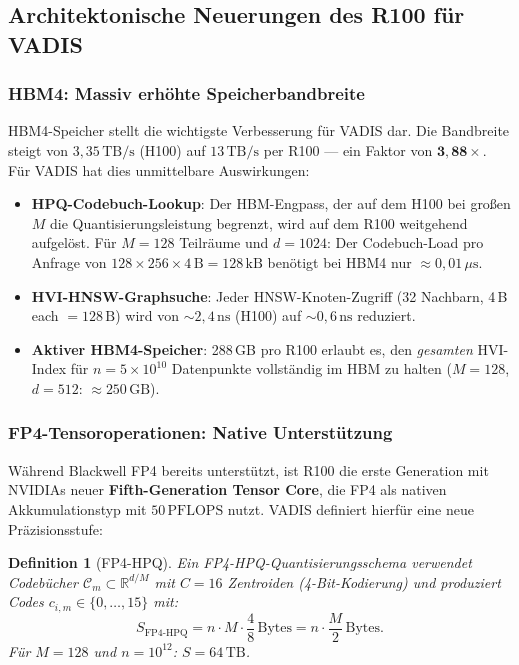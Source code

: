 ﻿\documentclass[12pt,a4paper]{article}
\newtheorem{definition}[theorem]{Definition}
\begin{document}
\subsection{Architektonische Neuerungen des R100 für VADIS}
\label{sub:r100_features}

\subsubsection{HBM4: Massiv erhöhte Speicherbandbreite}

HBM4-Speicher stellt die wichtigste Verbesserung für VADIS dar.
Die Bandbreite steigt von $3{,}35\,\text{TB/s}$ (H100) auf
$13\,\text{TB/s}$ per R100 --- ein Faktor von $\mathbf{3{,}88\times}$.
Für VADIS hat dies unmittelbare Auswirkungen:

\begin{itemize}[leftmargin=1.4em, itemsep=2pt]
  \item \textbf{HPQ-Codebuch-Lookup}: Der HBM-Engpass, der auf dem
        H100 bei großen $M$ die Quantisierungsleistung begrenzt,
        wird auf dem R100 weitgehend aufgelöst. Für $M = 128$
        Teilräume und $d = 1024$: Der Codebuch-Load pro
        Anfrage von $128 \times 256 \times 4\,\text{B} = 128\,\text{kB}$
        benötigt bei HBM4 nur $\approx 0{,}01\,\mu\text{s}$.
  \item \textbf{HVI-HNSW-Graphsuche}: Jeder HNSW-Knoten-Zugriff
        (32 Nachbarn, 4\,B each $= 128\,\text{B}$) wird von
        $\sim 2{,}4\,\text{ns}$ (H100) auf $\sim 0{,}6\,\text{ns}$ reduziert.
  \item \textbf{Aktiver HBM4-Speicher}: 288\,GB pro R100 erlaubt
        es, den \emph{gesamten} HVI-Index für
        $n = 5 \times 10^{10}$ Datenpunkte vollständig im HBM
        zu halten ($M=128$, $d=512$: $\approx 250\,\text{GB}$).
\end{itemize}

\subsubsection{FP4-Tensoroperationen: Native Unterstützung}

Während Blackwell FP4 bereits unterstützt, ist R100 die erste
Generation mit NVIDIAs neuer \textbf{Fifth-Generation Tensor Core},
die FP4 als nativen Akkumulationstyp mit $50\,\text{PFLOPS}$ nutzt.
VADIS definiert hierfür eine neue Präzisionsstufe:

\begin{definition}[FP4-HPQ]
\label{def:fp4hpq}
Ein FP4-HPQ-Quantisierungsschema verwendet Codebücher
$\mathcal{C}_m \subset \mathbb{R}^{d/M}$ mit $C = 16$
Zentroiden (4-Bit-Kodierung) und produziert Codes
$c_{i,m} \in \{0,\ldots,15\}$ mit:
\[
  S_{\text{FP4-HPQ}} = n \cdot M \cdot \frac{4}{8}\,\text{Bytes}
  = n \cdot \frac{M}{2}\,\text{Bytes}.
\]
Für $M = 128$ und $n = 10^{12}$: $S = 64\,\text{TB}$.
\end{definition}
\end{document}
